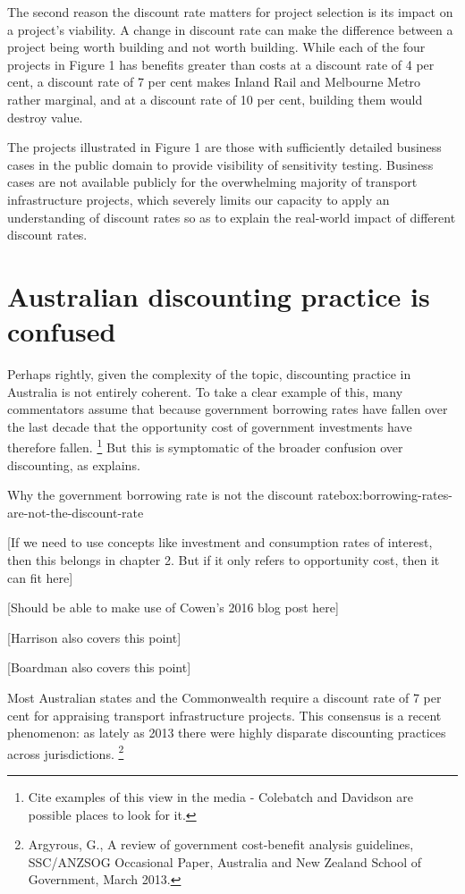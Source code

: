 The second reason the discount rate matters for project selection is its impact on a project’s viability. A change in discount rate can make the difference between a project being worth building and not worth building. While each of the four projects in Figure 1 has benefits greater than costs at a discount rate of 4 per cent, a discount rate of 7 per cent makes Inland Rail and Melbourne Metro rather marginal, and at a discount rate of 10 per cent, building them would destroy value. 

The projects illustrated in Figure 1 are those with sufficiently detailed business cases in the public domain to provide visibility of sensitivity testing. Business cases are not available publicly for the overwhelming majority of transport infrastructure projects, which severely limits our capacity to apply an understanding of discount rates so as to explain the real-world impact of different discount rates.  

\section{Australian discounting practice is confused}
Perhaps rightly, given the complexity of the topic, discounting practice in Australia is not entirely coherent. To take a clear example of this, many commentators assume that because government borrowing rates have fallen over the last decade that the opportunity cost of government investments have therefore fallen.%
    \footnote{Cite examples of this view in the media - Colebatch and Davidson are possible places to look for it.}
But this is symptomatic of the broader confusion over discounting, as  explains. 

\begin{smallbox}{Why the government borrowing rate is not the discount rate}{box:borrowing-rates-are-not-the-discount-rate}

[If we need to use concepts like investment and consumption rates of interest, then this belongs in chapter 2. But if it only refers to opportunity cost, then it can fit here]

[Should be able to make use of Cowen's 2016 blog post here]

[Harrison also covers this point] 

[Boardman also covers this point] 

\end{smallbox}

Most Australian states and the Commonwealth require a discount rate of 7 per cent for appraising transport infrastructure projects. This consensus is a recent phenomenon: as lately as 2013 there were highly disparate discounting practices across jurisdictions.%
    \footnote{Argyrous, G., A review of government cost-benefit analysis guidelines, SSC/ANZSOG Occasional Paper, Australia and New Zealand School of Government, March 2013.}

